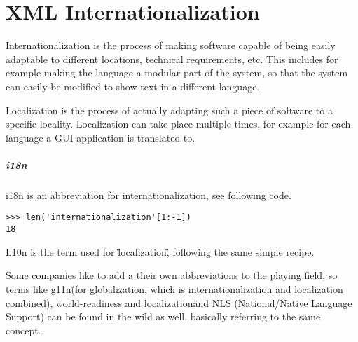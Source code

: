 \chapter{XML Internationalization}
Internationalization is the process of making software capable of being easily adaptable to different locations, technical requirements, etc. This includes for example making the language a modular part of the system, so that the system can easily be modified to show text in a different language.

Localization is the process of actually adapting such a piece of software to a specific locality. Localization can take place multiple times, for example for each language a GUI application is translated to.
\paragraph{i18n}
i18n is an abbreviation for internationalization, see following code.
\begin{verbatim}
>>> len('internationalization'[1:-1])
18
\end{verbatim}
L10n is the term used for \"localization\", following the same simple recipe.

Some companies like to add a their own abbreviations to the playing field, so terms like \"g11n\" (for globalization, which is internationalization and localization combined), \"world-readiness and localization\" and NLS (National/Native Language Support) can be found in the wild as well, basically referring to the same concept.
